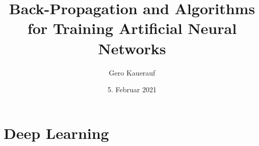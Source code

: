 \documentclass[t]{beamer}
\begin{document}

\title{Back-Propagation and Algorithms for Training Artificial Neural Networks}
\date{5. Februar 2021}
\author{Gero Kauerauf}

\frame{\titlepage}

\section{Deep Learning}
\end{document}
